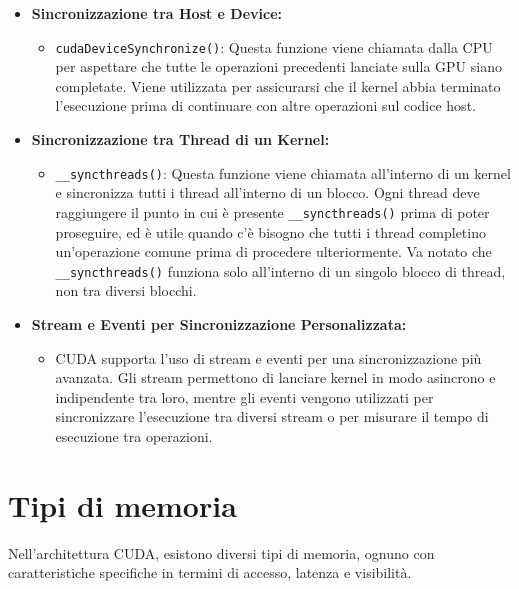 \documentclass[12pt,a4paper]{report}
\begin{document}
\begin{itemize}
    \item \textbf{Sincronizzazione tra Host e Device:}
    \begin{itemize}
        \item \texttt{cudaDeviceSynchronize()}: Questa funzione viene chiamata dalla CPU per aspettare che tutte le operazioni precedenti lanciate sulla GPU siano completate. Viene utilizzata per assicurarsi che il kernel abbia terminato l'esecuzione prima di continuare con altre operazioni sul codice host.
    \end{itemize}
    
    \item \textbf{Sincronizzazione tra Thread di un Kernel:}
    \begin{itemize}
        \item \texttt{\_\_syncthreads()}: Questa funzione viene chiamata all'interno di un kernel e sincronizza tutti i thread all'interno di un blocco. Ogni thread deve raggiungere il punto in cui è presente \texttt{\_\_syncthreads()} prima di poter proseguire, ed è utile quando c'è bisogno che tutti i thread completino un’operazione comune prima di procedere ulteriormente. Va notato che \texttt{\_\_syncthreads()} funziona solo all'interno di un singolo blocco di thread, non tra diversi blocchi.
    \end{itemize}
    
    \item \textbf{Stream e Eventi per Sincronizzazione Personalizzata:}
    \begin{itemize}
        \item CUDA supporta l'uso di stream e eventi per una sincronizzazione più avanzata. Gli stream permettono di lanciare kernel in modo asincrono e indipendente tra loro, mentre gli eventi vengono utilizzati per sincronizzare l'esecuzione tra diversi stream o per misurare il tempo di esecuzione tra operazioni.
    \end{itemize}
\end{itemize}

\section{Tipi di memoria}

Nell'architettura CUDA, esistono diversi tipi di memoria, ognuno con caratteristiche specifiche in termini di accesso, latenza e visibilità.
\end{document}
